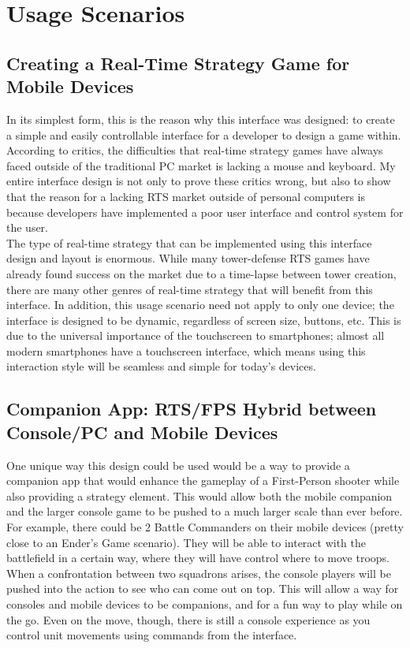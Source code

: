 \documentclass[11pt]{article}
\begin{document}
\section{Usage Scenarios}
	\subsection{Creating a Real-Time Strategy Game for Mobile Devices}
	In its simplest form, this is the reason why this interface was designed: to create a simple and easily controllable interface for a developer to design a game within. According to critics, the difficulties that real-time strategy games have always faced outside of the traditional PC market is lacking a mouse and keyboard. My entire interface design is not only to prove these critics wrong, but also to show that the reason for a lacking RTS market outside of personal computers is because developers have implemented a poor user interface and control system for the user. \\
	\indent The type of real-time strategy that can be implemented using this interface design and layout is enormous. While many tower-defense RTS games have already found success on the market due to a time-lapse between tower creation, there are many other genres of real-time strategy that will benefit from this interface. In addition, this usage scenario need not apply to only one device; the interface is designed to be dynamic, regardless of screen size, buttons, etc. This is due to the universal importance of the touchscreen to smartphones; almost all modern smartphones have a touchscreen interface, which means using this interaction style will be seamless and simple for today's devices.
	\subsection{Companion App: RTS/FPS Hybrid between Console/PC and Mobile Devices}
	One unique way this design could be used would be a way to provide a companion app that would enhance the gameplay of a First-Person shooter while also providing a strategy element. This would allow both the mobile companion and the larger console game to be pushed to a much larger scale than ever before. For example, there could be 2 Battle Commanders on their mobile devices (pretty close to an Ender's Game scenario). They will be able to interact with the battlefield in a certain way, where they will have control where to move troops. When a confrontation between two squadrons arises, the console players will be pushed into the action to see who can come out on top. This will allow a way for consoles and mobile devices to be companions, and for a fun way to play while on the go. Even on the move, though, there is still a console experience as you control unit movements using commands from the interface.
\end{document}
